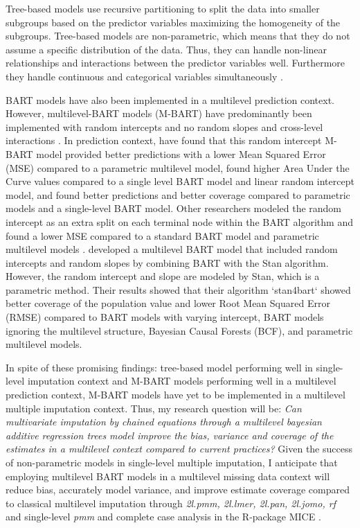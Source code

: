 \documentclass[10pt, a4paper, titlepage]{article}
\begin{document}
Tree-based models use recursive partitioning to split the data into smaller subgroups based on the predictor variables maximizing the homogeneity of the subgroups. Tree-based models are non-parametric, which means that they do not assume a specific distribution of the data. Thus, they can handle non-linear relationships and interactions between the predictor variables well. Furthermore they handle continuous and categorical variables simultaneously \citep{hill2020, burgette2010, lin2019, chipman2010, james2021, salditt2023, breiman1984}.

BART models have also been implemented in a multilevel prediction context. However, multilevel-BART models (M-BART) have predominantly been implemented with random intercepts and no random slopes and cross-level interactions \citep{chen2020, wagner2020, tan2016, wundervald2022}. In prediction context, \citet{wagner2020} have found that this random intercept M-BART model provided better predictions with a lower Mean Squared Error (MSE) compared to a parametric multilevel model, \citet{tan2016} found higher Area Under the Curve values compared to a single level BART model and linear random intercept model, and \citet{chen2020} found better predictions and better coverage compared to parametric models and a single-level BART model. Other researchers modeled the random intercept as an extra split on each terminal node within the BART algorithm and found a lower MSE compared to a standard BART model and parametric multilevel models \citep{wundervald2022}. \citet{dorie2022} developed a multilevel BART model that included random intercepts and random slopes by combining BART with the Stan algorithm. However, the random intercept and slope are modeled by Stan, which is a parametric method. Their results showed that their algorithm `stan4bart` showed better coverage of the population value and lower Root Mean Squared Error (RMSE) compared to BART models with varying intercept, BART models ignoring the multilevel structure, Bayesian Causal Forests (BCF), and parametric multilevel models.

In spite of these promising findings: tree-based model performing well in single-level imputation context and M-BART models performing well in a multilevel prediction context, M-BART models have yet to be implemented in a multilevel multiple imputation context. Thus, my research question will be: \textit{Can multivariate imputation by chained equations through a multilevel bayesian additive regression trees model improve the bias, variance and coverage of the estimates in a multilevel context compared to current practices?} Given the success of non-parametric models in single-level multiple imputation, I anticipate that employing multilevel BART models in a multilevel missing data context will reduce bias, accurately model variance, and improve estimate coverage compared to classical multilevel imputation through \textit{2l.pmm, 2l.lmer, 2l.pan, 2l.jomo, rf} and single-level \textit{pmm} and complete case analysis in the R-package MICE \citep{buuren2011}.
\end{document}
